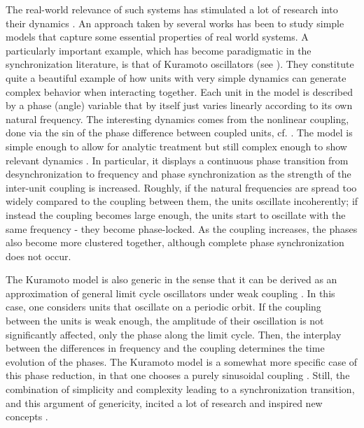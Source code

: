 The real-world relevance of such systems has stimulated a lot of research into their dynamics \cite{feudel2008complex}. An approach taken by several works has been to study simple models that capture some essential properties of real world systems. A particularly important example, which has become paradigmatic in the synchronization literature, is that of Kuramoto oscillators (see ). They constitute quite a beautiful example of how units with very simple dynamics can generate complex behavior when interacting together. Each unit in the model is described by a phase (angle) variable that by itself just varies linearly according to its own natural frequency. The interesting dynamics comes from the nonlinear coupling, done via the sin of the phase difference between coupled units, cf. . The model is simple enough to allow for analytic treatment but still complex enough to show relevant dynamics \cite{strogatz2000from, acebron2005kuramoto}. In particular, it displays a continuous phase transition from desynchronization to frequency and phase synchronization as the strength of the inter-unit coupling is increased. Roughly, if the natural frequencies are spread too widely compared to the coupling between them, the units oscillate incoherently; if instead the coupling becomes large enough, the units start to oscillate with the same frequency - they become phase-locked. As the coupling increases, the phases also become more clustered together, although complete phase synchronization does not occur. 

The Kuramoto model is also generic in the sense that it can be derived as an approximation of general limit cycle oscillators under weak coupling \cite{boccaletti2018synchronization}. In this case, one considers units that oscillate on a periodic orbit. If the coupling between the units is weak enough, the amplitude of their oscillation is not significantly affected, only the phase along the limit cycle. Then, the interplay between the differences in frequency and the coupling determines the time evolution of the phases. The Kuramoto model is a somewhat more specific case of this phase reduction, in that one chooses a purely sinusoidal coupling \cite{strogatz2000from}. Still, the combination of simplicity and complexity leading to a synchronization transition, and this argument of genericity, incited a lot of research and inspired new concepts \cite{acebron2005kuramoto, rodrigues2016the, strogatz2000from}.

